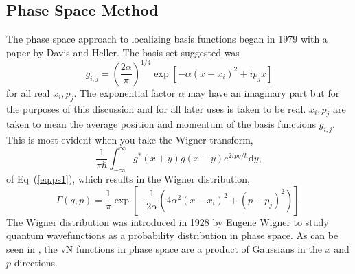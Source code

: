{ \subsection{Phase Space Method}\label{sec:ps}
 The phase space approach to localizing basis functions began in 1979 with a paper by Davis and Heller\cite{Davis1979}.  The basis set suggested was  
 \begin{equation}\label{eq.ps1}
 g_{i,j}=\left(\dfrac{2\alpha}{\pi}\right)^{1/4}\exp\left[-\alpha\left(x-x_i\right)^2+i p_j x\right]
 \end{equation}
 for all real $x_i,p_j$.  The exponential factor $\alpha$ may have an imaginary part but for the purposes of this discussion and for all later uses is taken to be real. $x_i,p_j$ are taken to mean the average position and momentum of the basis functions $g_{i,j}$.  This is most evident when you take the Wigner transform,
\begin{equation}
\dfrac{1}{\pi \hbar}\int_{-\infty}^{\infty} g^*\left(x+y\right)g\left(x-y\right)e^{2 i p y/\hbar}\mathrm{d}y,
\end{equation} 
  of Eq~(\ref{eq.ps1}), which results in the Wigner distribution,
 \begin{equation}\label{eq.wps1}
\Gamma\left(q,p\right)=\dfrac{1}{\pi}\exp\left[-\dfrac{1}{2\alpha}\left(4\alpha^2\left(x-x_i\right)^2+\left(p-p_j\right)^2\right)\right].
\end{equation}
The Wigner distribution was introduced in 1928\cite{Wigner1928} by Eugene Wigner to study quantum wavefunctions as a probability distribution in phase space.  As can be seen in , the vN functions in phase space are a product of Gaussians in the $x$ and $p$ directions.


}
